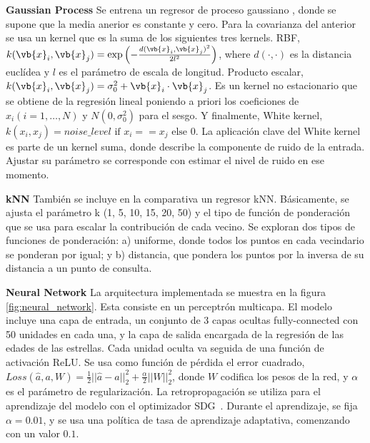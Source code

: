 \textbf{Gaussian Process} {} Se entrena un regresor de proceso gaussiano \cite{Rasmussen2006}, donde se supone que la media anerior es constante y cero. Para la covarianza del anterior se usa un kernel que es la suma de los siguientes tres kernels. RBF, $k(\vb{x}_i, \vb{x}_j) = \text{exp}\left(- \frac{d(\vb{x}_i, \vb{x}_j)^2}{2l^2} \right)$, where $d(\cdot, \cdot)$ es la distancia euclídea y $l$ es el parámetro de escala de longitud. Producto escalar, $k(\vb{x}_i, \vb{x}_j) = \sigma_0 ^ 2 + \vb{x}_i \cdot \vb{x}_j$. Es un kernel no estacionario que se obtiene de la regresión lineal poniendo a priori los coeficiones de $x_i (i = 1, \ldots, N)$ y  $N(0, \sigma_0^2)$ para el sesgo. Y finalmente, White kernel, $k(x_i, x_j) = noise\_level \text{ if } x_i == x_j \text{ else } 0$. La aplicación clave del White kernel es parte de un kernel suma, donde describe la componente de ruido de la entrada. Ajustar su parámetro se corresponde con estimar el nivel de ruido en ese momento.

\textbf{kNN} {} También se incluye en la comparativa un regresor kNN. Básicamente, se ajusta el parámetro k (1, 5, 10, 15, 20, 50) y el tipo de función de ponderación que se usa para escalar la contribución de cada vecino. Se exploran dos tipos de funciones de ponderación: a) uniforme, donde todos los puntos en cada vecindario se ponderan por igual; y b) distancia, que pondera los puntos por la inversa de su distancia a un punto de consulta. 

\textbf{Neural Network} {} La arquitectura implementada se muestra en la figura \ref{fig:neural_network}. Esta consiste en un perceptrón multicapa. El modelo incluye una capa de entrada, un conjunto de 3 capas ocultas fully-connected con 50 unidades en cada una, y la capa de salida encargada de la regresión de las edades de las estrellas. Cada unidad oculta va seguida de una función de activación ReLU. Se usa como función de pérdida el error cuadrado,$Loss(\hat{a},a,W) = \frac{1}{2}||\hat{a} - a ||_2^2 + \frac{\alpha}{2} ||W||_2^2$, donde $W$ codifica los pesos de la red, y $\alpha$ es el parámetro de regularización. La retropropagación \cite{LeCun2012} se utiliza para el aprendizaje del modelo con el optimizador SDG~\cite{sgd}. Durante el aprendizaje, se fija $\alpha=0.01$, y se usa una política de tasa de aprendizaje adaptativa, comenzando con un valor $0.1$.

